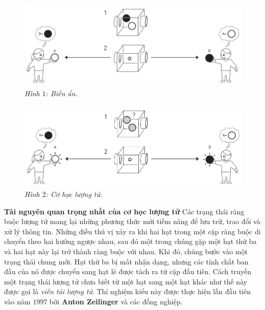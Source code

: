\begin{multicols}{2}
\begin{figure}[H]
		\vspace*{5pt}
		\centering
		\captionsetup{labelformat= empty, justification=centering}
		\includegraphics[width= 1\linewidth]{1}
		\caption{\small\textit{\color{timhieukhoahoc}Hình $1$: Biến ẩn.}}
		\vspace*{-10pt}
	\end{figure}
	\begin{figure}[H]
		\vspace*{-5pt}
		\centering
		\captionsetup{labelformat= empty, justification=centering}
		\includegraphics[width= 1\linewidth]{2}
		\caption{\small\textit{\color{timhieukhoahoc}Hình $2$: Cơ học lượng tử.}}
		\vspace*{-10pt}
	\end{figure}
	\textbf{\color{timhieukhoahoc}Tài nguyên quan trọng nhất của cơ học lượng tử}
	\vskip 0.1cm
	Các trạng thái ràng buộc lượng tử mang lại những phương thức mới tiềm năng để lưu trữ, trao đổi và xử lý thông tin.
	\vskip 0.1cm
	Những điều thú vị xảy ra khi hai hạt trong một cặp ràng buộc di chuyển theo hai hướng ngược nhau, sau đó một trong chúng gặp một hạt thứ ba và hai hạt này lại trở thành ràng buộc với nhau. Khi đó, chúng bước vào một trạng thái chung mới. Hạt thứ ba bị mất nhận dạng, nhưng các tính chất ban đầu của nó được chuyển sang hạt lẻ được tách ra từ cặp đầu tiên. Cách truyền một trạng thái lượng tử chưa biết từ một hạt sang một hạt khác như thế này được gọi là \textit{viễn tải lượng tử}. Thí nghiệm kiểu này được thực hiện lần đầu tiên vào năm $1997$ bởi \textbf{\color{timhieukhoahoc}Anton Zeilinger} và các đồng nghiệp.

\end{multicols}
